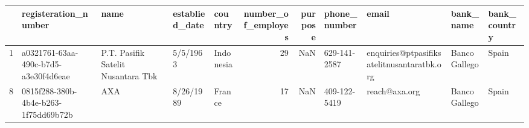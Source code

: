 \begin{tabular}{lllllrrllll}
\toprule
{} &                  registeration\_number &                                name & establied\_date &    country &  number\_of\_employes &  purpose &  phone\_number &                                       email &      bank\_name & bank\_country \\
\midrule
1 &  a0321761-63aa-490c-b7d5-a3e30f4d6eae &  P.T. Pasifik Satelit Nusantara Tbk &       5/5/1963 &  Indonesia &                  29 &      NaN &  629-141-2587 &  enquiries@ptpasifiksatelitnusantaratbk.org &  Banco Gallego &        Spain \\
8 &  0815f288-380b-4b4e-b263-1f75dd69b72b &                                 AXA &      8/26/1989 &     France &                  17 &      NaN &  409-122-5419 &                               reach@axa.org &  Banco Gallego &        Spain \\
\bottomrule
\end{tabular}
